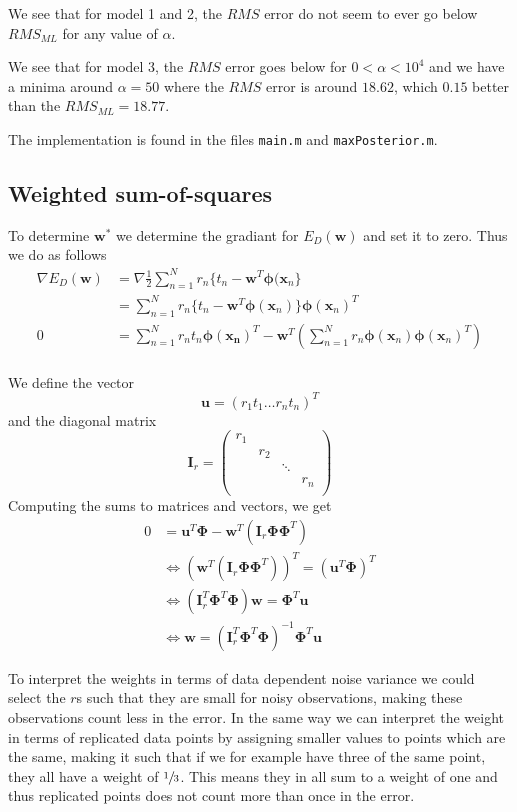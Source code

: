 \documentclass[a4paper, 11pt]{article}
\newcommand{\vect}[1]{\mathbf{#1}}
\newcommand{\mat}[1]{\textbf{#1}}
\begin{document}
We see that for model 1 and 2, the $RMS$ error do not seem to ever go below $RMS_{ML}$ for any value of $\alpha$.

We see that for model 3, the $RMS$ error goes below for $0 < \alpha < 10^4$ and we have a minima around $\alpha = 50$ where the $RMS$ error is around $18.62$, which $0.15$ better than the $RMS_{ML} = 18.77$.

The implementation is found in the files \texttt{main.m} and \texttt{maxPosterior.m}.

\subsection{Weighted sum-of-squares}
To determine $\vect{w}^*$ we determine the gradiant for $E_D(\vect{w})$ and set it to zero. Thus we do as follows
\begin{align*}
    \nabla E_D(\vect{w})
    &= \nabla \frac{1}{2} \sum_{n=1}^{N} r_n \lbrace t_n - \vect{w}^T \bm\phi(\vect{x}_n \rbrace \\
    &= \sum_{n=1}^{N} r_n \lbrace t_n - \vect{w}^T \bm\phi(\vect{x}_n) \rbrace \bm\phi(\vect{x}_n)^T \\
    0
    &= \sum_{n=1}^{N} r_n t_n \bm\phi(\vect{x_n})^T - \vect{w}^T \left( \sum_{n=1}^{N} r_n \bm\phi(\vect{x}_n) \bm\phi(\vect{x}_n)^T \right) \\
\end{align*}

We define the vector
\[
\vect{u} = (r_1t_1 \ldots r_nt_n)^T
\]
and the diagonal matrix
\[
\mat{I}_r = \begin{pmatrix}
    r_1 & & & \\
    & r_2 & & \\
    & & \ddots & \\
    & & & r_n \\
\end{pmatrix}
\]
Computing the sums to matrices and vectors, we get
\begin{align*}
    0 &= \vect{u}^T \bm\Phi - \vect{w}^T (\mat{I}_r \bm\Phi \bm\Phi^T) \\
    &\Leftrightarrow (\vect{w}^T (\mat{I}_r \bm\Phi \bm\Phi^T))^T = (\vect{u}^T \bm\Phi)^T \\
    &\Leftrightarrow (\mat{I}_r^T \bm\Phi^T \bm\Phi) \vect{w} = \bm\Phi^T \vect{u} \\
    &\Leftrightarrow \vect{w} = (\mat{I}_r^T \bm\Phi^T \bm\Phi)^{-1} \bm\Phi^T \vect{u}
\end{align*}

To interpret the weights in terms of data dependent noise variance we could select the $r$s such that they are small for noisy observations, making these observations count less in the error. In the same way we can interpret the weight in terms of replicated data points by assigning smaller values to points which are the same, making it such that if we for example have three of the same point, they all have a weight of $\sfrac{1}{3}$. This means they in all sum to a weight of one and thus replicated points does not count more than once in the error.
\end{document}
